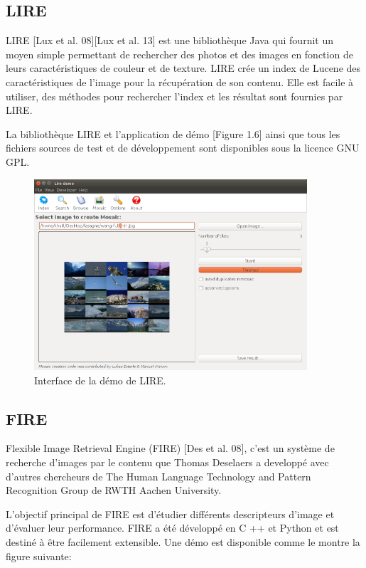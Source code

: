 \subsection*{LIRE}
	LIRE [Lux et al. 08][Lux et al. 13] est une bibliothèque Java qui fournit un moyen simple permettant de rechercher des photos et des images en fonction de leurs caractéristiques de couleur et de texture. LIRE crée un index de Lucene des caractéristiques de l'image pour la récupération de son contenu. Elle est facile à utiliser, des méthodes pour rechercher l'index et les résultat sont fournies par LIRE.
	
	La bibliothèque LIRE et l'application de démo [Figure 1.6] ainsi que tous les fichiers sources de test et de développement sont disponibles sous la licence GNU GPL.

\begin{figure}[H]
	\centering
		\includegraphics[width=4in]{Figures/lire-demo.png}
	\caption[An Electron]{Interface de la démo de LIRE.}
	\label{fig:Electron}
\end{figure}


\subsection*{FIRE}
	Flexible Image Retrieval Engine (FIRE) [Des et al. 08], c'est un système de recherche d'images par le contenu que Thomas Deselaers a developpé avec d'autres chercheurs de The Human Language Technology and Pattern Recognition Group de RWTH Aachen University.

L'objectif principal de FIRE est d'étudier différents descripteurs d'image et d'évaluer leur performance. FIRE a été développé en C ++ et Python et est destiné à être facilement extensible. Une démo est disponible comme le montre la figure suivante:


